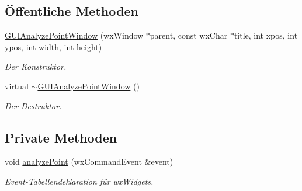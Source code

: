 \subsection*{Öffentliche Methoden}
\begin{DoxyCompactItemize}
\item 
\hyperlink{classGUIAnalyzePointWindow_abf699fcd4ffb8bec8b0565e6404b0af3}{G\-U\-I\-Analyze\-Point\-Window} (wx\-Window $\ast$parent, const wx\-Char $\ast$title, int xpos, int ypos, int width, int height)
\begin{DoxyCompactList}\small\item\em Der Konstruktor. \end{DoxyCompactList}\item 
virtual \hyperlink{classGUIAnalyzePointWindow_a9edaece1fef847902309af1f63eb168a}{$\sim$\-G\-U\-I\-Analyze\-Point\-Window} ()
\begin{DoxyCompactList}\small\item\em Der Destruktor. \end{DoxyCompactList}\end{DoxyCompactItemize}
\subsection*{Private Methoden}
\begin{DoxyCompactItemize}
\item 
void \hyperlink{classGUIAnalyzePointWindow_aa84ea9958e8b41423f01316d01ba5151}{analyze\-Point} (wx\-Command\-Event \&event)
\begin{DoxyCompactList}\small\item\em Event-\/\-Tabellendeklaration für wx\-Widgets. \end{DoxyCompactList}\end{DoxyCompactItemize}
